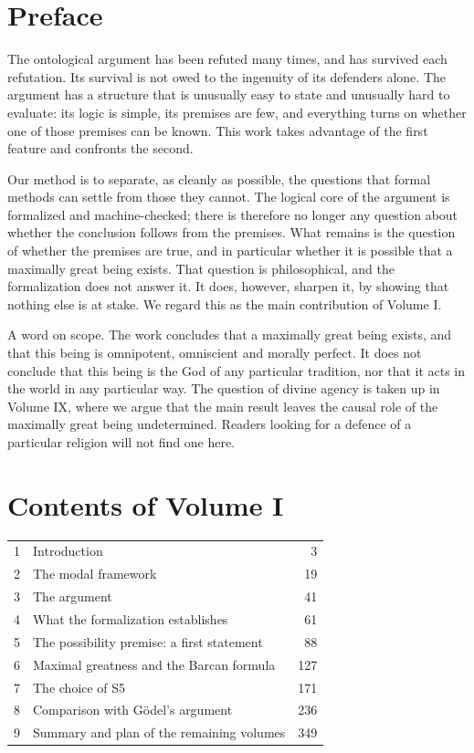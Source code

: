 \documentclass{situationist-preprint}
\begin{document}
\section*{Preface}

The ontological argument has been refuted many times, and has survived each refutation. Its survival is not owed to the ingenuity of its defenders alone. The argument has a structure that is unusually easy to state and unusually hard to evaluate: its logic is simple, its premises are few, and everything turns on whether one of those premises can be known. This work takes advantage of the first feature and confronts the second.

Our method is to separate, as cleanly as possible, the questions that formal methods can settle from those they cannot. The logical core of the argument is formalized and machine-checked; there is therefore no longer any question about whether the conclusion follows from the premises. What remains is the question of whether the premises are true, and in particular whether it is possible that a maximally great being exists. That question is philosophical, and the formalization does not answer it. It does, however, sharpen it, by showing that nothing else is at stake. We regard this as the main contribution of Volume I.

A word on scope. The work concludes that a maximally great being exists, and that this being is omnipotent, omniscient and morally perfect. It does not conclude that this being is the God of any particular tradition, nor that it acts in the world in any particular way. The question of divine agency is taken up in Volume IX, where we argue that the main result leaves the causal role of the maximally great being undetermined. Readers looking for a defence of a particular religion will not find one here.

\section*{Contents of Volume I}

\begin{center}\small
\begin{tabular}{@{}rlr@{}}
1 & Introduction & 3 \\
2 & The modal framework & 19 \\
3 & The argument & 41 \\
4 & What the formalization establishes & 61 \\
5 & The possibility premise: a first statement & 88 \\
6 & Maximal greatness and the Barcan formula & 127 \\
7 & The choice of S5 & 171 \\
8 & Comparison with Gödel's argument & 236 \\
9 & Summary and plan of the remaining volumes & 349 \\
\end{tabular}
\end{center}
\end{document}
